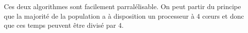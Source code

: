 \documentclass[../report]{subfiles}
\begin{document}
Ces deux algorithmes sont facilement parralélisable. 
On peut partir du principe que la majorité de la population a à disposition un processeur à 4 cœurs et donc que ces temps peuvent être divisé par 4.

\end{document}
